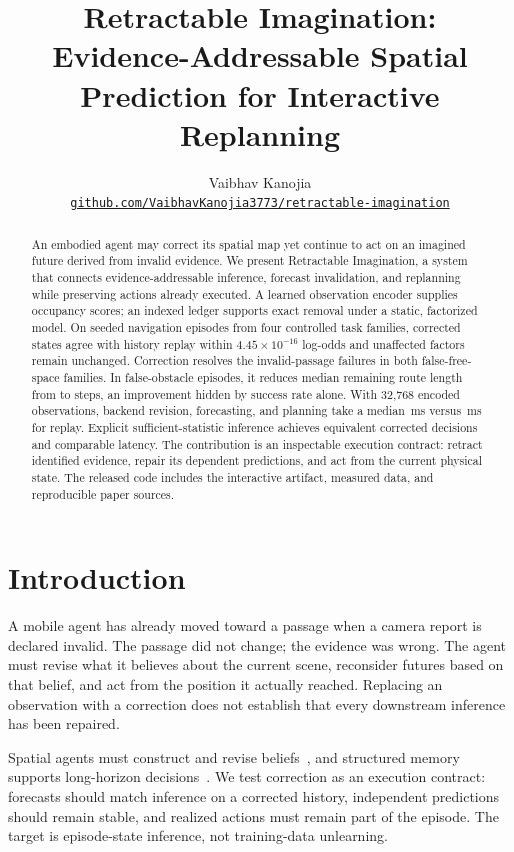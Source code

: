\documentclass{article}
\title{Retractable Imagination:\\Evidence-Addressable Spatial Prediction for Interactive Replanning}
\author{Vaibhav Kanojia\\[3pt]\href{https://github.com/VaibhavKanojia3773/retractable-imagination}{\scriptsize\texttt{github.com/VaibhavKanojia3773/retractable-imagination}}}
\begin{document}
\maketitle
\begin{abstract}
An embodied agent may correct its spatial map yet continue to act on an imagined future derived from invalid evidence. We present Retractable Imagination, a system that connects evidence-addressable inference, forecast invalidation, and replanning while preserving actions already executed. A learned observation encoder supplies occupancy scores; an indexed ledger supports exact removal under a static, factorized model. On \TaskN{} seeded navigation episodes from four controlled task families, corrected states agree with history replay within $4.45\times10^{-16}$ log-odds and unaffected factors remain unchanged. Correction resolves the invalid-passage failures in both false-free-space families. In false-obstacle episodes, it reduces median remaining route length from \BeforeSteps{} to \AfterSteps{} steps, an improvement hidden by success rate alone. With 32,768 encoded observations, backend revision, forecasting, and planning take a median \LongestIndexedMs{}\,ms versus \LongestReplayMs{}\,ms for replay. Explicit sufficient-statistic inference achieves equivalent corrected decisions and comparable latency. The contribution is an inspectable execution contract: retract identified evidence, repair its dependent predictions, and act from the current physical state. The released code includes the interactive artifact, measured data, and reproducible paper sources.
\end{abstract}

\section{Introduction}
A mobile agent has already moved toward a passage when a camera report is declared invalid. The passage did not change; the evidence was wrong. The agent must revise what it believes about the current scene, reconsider futures based on that belief, and act from the position it actually reached. Replacing an observation with a correction does not establish that every downstream inference has been repaired.

Spatial agents must construct and revise beliefs~\cite{zhang2026theory}, and structured memory supports long-horizon decisions~\cite{cherepanov2026elmur}. We test correction as an execution contract: forecasts should match inference on a corrected history, independent predictions should remain stable, and realized actions must remain part of the episode. The target is episode-state inference, not training-data unlearning.
\end{document}

